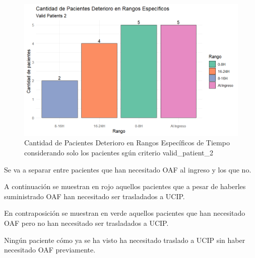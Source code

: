 \begin{figure}[H]
    \centering
    \includegraphics[scale = 1]{./img/bar-deterioro-valid-2.png}
    \caption{Cantidad de Pacientes Deterioro en Rangos Específicos de Tiempo considerando solo los pacientes sgún criterio valid\_patient\_2}
    \label{fig:bar-deterioro-valid-2}
\end{figure}

Se va a separar entre pacientes que han necesitado OAF al ingreso y los que no.

A continuación se muestran en rojo aquellos pacientes que a pesar de haberles suministrado OAF han necesitado ser trasladados a UCIP.

En contraposición se muestran en verde aquellos pacientes que han necesitado OAF pero no han necesitado ser trasladados a UCIP. 



Ningún paciente cómo ya se ha visto ha necesitado traslado a UCIP sin haber necesitado OAF previamente.

